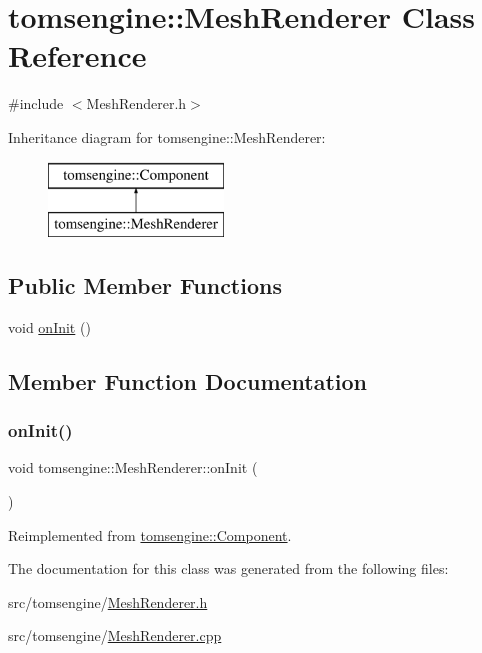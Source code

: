\hypertarget{classtomsengine_1_1_mesh_renderer}{}\section{tomsengine\+:\+:Mesh\+Renderer Class Reference}
\label{classtomsengine_1_1_mesh_renderer}


{\ttfamily \#include $<$Mesh\+Renderer.\+h$>$}

Inheritance diagram for tomsengine\+:\+:Mesh\+Renderer\+:\begin{figure}[H]
\begin{center}
\leavevmode
\includegraphics[height=2.000000cm]{classtomsengine_1_1_mesh_renderer}
\end{center}
\end{figure}
\subsection*{Public Member Functions}
\begin{DoxyCompactItemize}
\item 
void \mbox{\hyperlink{classtomsengine_1_1_mesh_renderer_a1811283a3daa29d1ee9f043fd99416a5}{on\+Init}} ()
\end{DoxyCompactItemize}


\subsection{Member Function Documentation}
\mbox{\label{classtomsengine_1_1_mesh_renderer_a1811283a3daa29d1ee9f043fd99416a5}} 
\subsubsection{\texorpdfstring{on\+Init()}{onInit()}}
{\footnotesize\ttfamily void tomsengine\+::\+Mesh\+Renderer\+::on\+Init (\begin{DoxyParamCaption}{ }\end{DoxyParamCaption})\hspace{0.3cm}{\ttfamily [virtual]}}



Reimplemented from \mbox{\hyperlink{classtomsengine_1_1_component}{tomsengine\+::\+Component}}.



The documentation for this class was generated from the following files\+:\begin{DoxyCompactItemize}
\item 
src/tomsengine/\mbox{\hyperlink{_mesh_renderer_8h}{Mesh\+Renderer.\+h}}\item 
src/tomsengine/\mbox{\hyperlink{_mesh_renderer_8cpp}{Mesh\+Renderer.\+cpp}}\end{DoxyCompactItemize}
